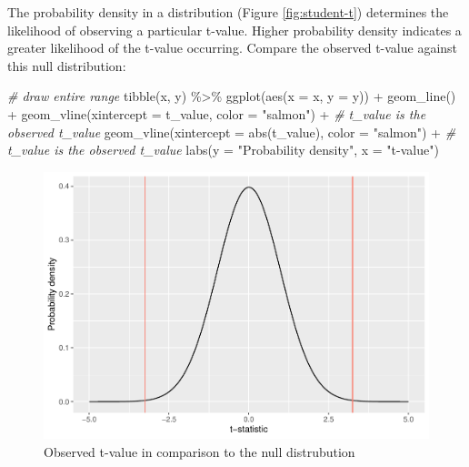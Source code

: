 \documentclass[
]{book}
\newenvironment{Shaded}{\begin{snugshade}}{\end{snugshade}}
\newcommand{\AttributeTok}[1]{\textcolor[rgb]{0.77,0.63,0.00}{#1}}
\newcommand{\CommentTok}[1]{\textcolor[rgb]{0.56,0.35,0.01}{\textit{#1}}}
\newcommand{\FunctionTok}[1]{\textcolor[rgb]{0.00,0.00,0.00}{#1}}
\newcommand{\NormalTok}[1]{#1}
\newcommand{\SpecialCharTok}[1]{\textcolor[rgb]{0.00,0.00,0.00}{#1}}
\newcommand{\StringTok}[1]{\textcolor[rgb]{0.31,0.60,0.02}{#1}}
\begin{document}
The probability density in a distribution (Figure \ref{fig:student-t}) determines the likelihood of observing a particular t-value. Higher probability density indicates a greater likelihood of the t-value occurring. Compare the observed t-value against this null distribution:

\begin{Shaded}
\begin{Highlighting}[]
\CommentTok{\# draw entire range}
\FunctionTok{tibble}\NormalTok{(x, y) }\SpecialCharTok{\%\textgreater{}\%} 
  \FunctionTok{ggplot}\NormalTok{(}\FunctionTok{aes}\NormalTok{(}\AttributeTok{x =}\NormalTok{ x,}
             \AttributeTok{y =}\NormalTok{ y)) }\SpecialCharTok{+}
  \FunctionTok{geom\_line}\NormalTok{() }\SpecialCharTok{+}
  \FunctionTok{geom\_vline}\NormalTok{(}\AttributeTok{xintercept =}\NormalTok{ t\_value,}
             \AttributeTok{color =} \StringTok{"salmon"}\NormalTok{) }\SpecialCharTok{+} \CommentTok{\# t\_value is the observed t\_value}
  \FunctionTok{geom\_vline}\NormalTok{(}\AttributeTok{xintercept =} \FunctionTok{abs}\NormalTok{(t\_value),}
             \AttributeTok{color =} \StringTok{"salmon"}\NormalTok{) }\SpecialCharTok{+} \CommentTok{\# t\_value is the observed t\_value}
  \FunctionTok{labs}\NormalTok{(}\AttributeTok{y =} \StringTok{"Probability density"}\NormalTok{,}
       \AttributeTok{x =} \StringTok{"t{-}value"}\NormalTok{) }
\end{Highlighting}
\end{Shaded}

\begin{figure}

{\centering \includegraphics{_main_files/figure-latex/student-t-obs-1} 

}

\caption{Observed t-value in comparison to the null distrubution}\label{fig:student-t-obs}
\end{figure}
\end{document}
